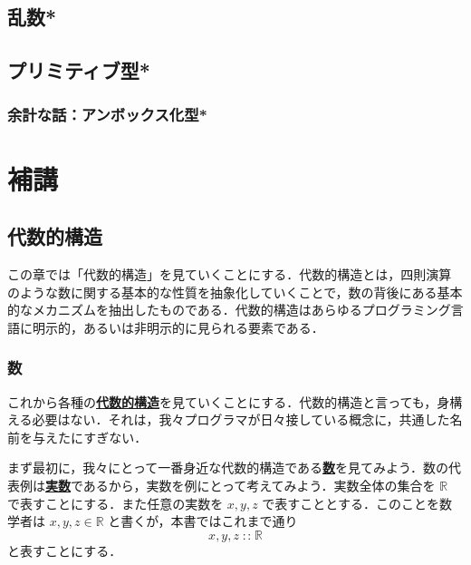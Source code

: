\documentclass[a4paper,twocolumn]{jsbook}
\newenvironment{leader}{\begingroup\gt}{\endgroup}
\newcommand{\keyword}[1]{{\underline{\textbf{#1}}}}
\DeclareMathOperator{\mIn}{{:\!:}}
\newcommand{\mSpecialSet}[1]{\mathbb{#1}} %
\newcommand{\mRSet}{\mSpecialSet{R}}
\begin{document}
\chapter{乱数*}
\chapter{プリミティブ型*}
\section{余計な話：アンボックス化型*}




\part{補講}


\chapter{代数的構造}

\begin{leader}
この章では「代数的構造」を見ていくことにする．代数的構造とは，四則演算のような数に関する基本的な性質を抽象化していくことで，数の背後にある基本的なメカニズムを抽出したものである．代数的構造はあらゆるプログラミング言語に明示的，あるいは非明示的に見られる要素である．
\end{leader}

\section{数}

これから各種の\keyword{代数的構造}を見ていくことにする．代数的構造と言っても，身構える必要はない．それは，我々プログラマが日々接している概念に，共通した名前を与えたにすぎない．

まず最初に，我々にとって一番身近な代数的構造である\keyword{数}を見てみよう．数の代表例は\keyword{実数}であるから，実数を例にとって考えてみよう．実数全体の集合を $\mRSet$ で表すことにする．また任意の実数を $x,y,z$ で表すこととする．このことを数学者は $x,y,z\in\mRSet$ と書くが，本書ではこれまで通り
\begin{equation}
x,y,z\mIn\mRSet
\end{equation}
と表すことにする．
\end{document}
